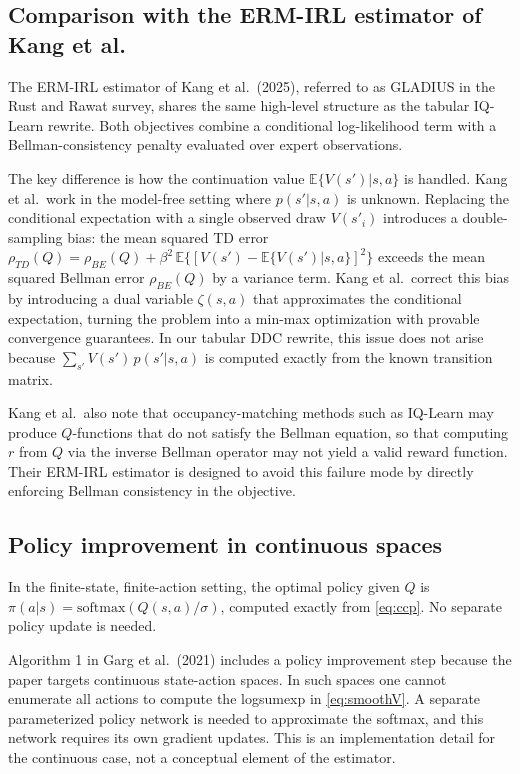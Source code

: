 \documentclass[11pt]{article}
\begin{document}
\subsection{Comparison with the ERM-IRL estimator of Kang et al.}

The ERM-IRL estimator of Kang et al.\ (2025), referred to as GLADIUS in the Rust and Rawat survey, shares the same high-level structure as the tabular IQ-Learn rewrite. Both objectives combine a conditional log-likelihood term with a Bellman-consistency penalty evaluated over expert observations.

The key difference is how the continuation value $\mathbb{E}\{V(s')|s,a\}$ is handled. Kang et al.\ work in the model-free setting where $p(s'|s,a)$ is unknown. Replacing the conditional expectation with a single observed draw $V(s'_i)$ introduces a double-sampling bias: the mean squared TD error $\rho_{TD}(Q) = \rho_{BE}(Q) + \beta^2\,\mathbb{E}\{[V(s') - \mathbb{E}\{V(s')|s,a\}]^2\}$ exceeds the mean squared Bellman error $\rho_{BE}(Q)$ by a variance term. Kang et al.\ correct this bias by introducing a dual variable $\zeta(s,a)$ that approximates the conditional expectation, turning the problem into a min-max optimization with provable convergence guarantees. In our tabular DDC rewrite, this issue does not arise because $\sum_{s'} V(s')\,p(s'|s,a)$ is computed exactly from the known transition matrix.

Kang et al.\ also note that occupancy-matching methods such as IQ-Learn may produce $Q$-functions that do not satisfy the Bellman equation, so that computing $r$ from $Q$ via the inverse Bellman operator may not yield a valid reward function. Their ERM-IRL estimator is designed to avoid this failure mode by directly enforcing Bellman consistency in the objective.

\subsection{Policy improvement in continuous spaces}
\label{sec:policy}

In the finite-state, finite-action setting, the optimal policy given $Q$ is $\pi(a|s) = \mathrm{softmax}(Q(s,a)/\sigma)$, computed exactly from \eqref{eq:ccp}. No separate policy update is needed.

Algorithm 1 in Garg et al.\ (2021) includes a policy improvement step because the paper targets continuous state-action spaces. In such spaces one cannot enumerate all actions to compute the logsumexp in \eqref{eq:smoothV}. A separate parameterized policy network is needed to approximate the softmax, and this network requires its own gradient updates. This is an implementation detail for the continuous case, not a conceptual element of the estimator.
\end{document}
